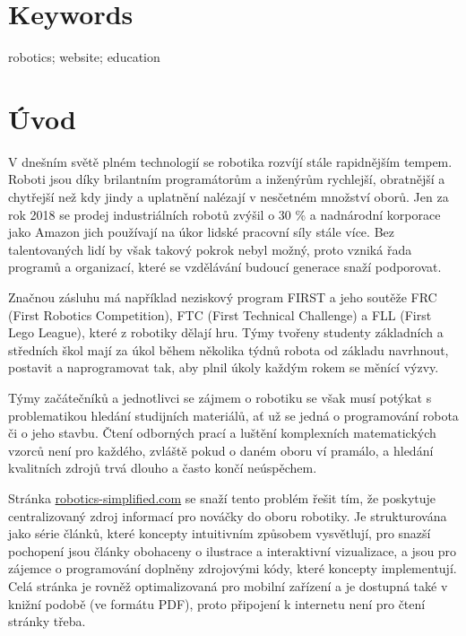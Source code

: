 \documentclass[a4paper, 12pt]{article}
\begin{document}
  \section*{\normalfont\textbf{Keywords}}
  robotics; website; education

  \newpage

  \setcounter{savepage}{\value{page}}%

  \renewcommand{\contentsname}{Obsah}
  \tableofcontents

  \newpage

  \section{Úvod}
  V dnešním světě plném technologií se robotika rozvíjí stále rapidnějším tempem. Roboti jsou díky brilantním programátorům a inženýrům rychlejší, obratnější a chytřejší než kdy jindy a uplatnění nalézají v nesčetném množství oborů. Jen za rok 2018 se prodej industriálních robotů zvýšil o 30 \%\cite{industrial-robot-growth} a nadnárodní korporace jako Amazon jich používají na úkor lidské pracovní síly stále více\cite{amazon-hiring}. Bez talentovaných lidí by však takový pokrok nebyl možný, proto vzniká řada programů a organizací, které se vzdělávání budoucí generace snaží podporovat.

  Značnou zásluhu má například neziskový program FIRST\cite{first-inspires} a jeho soutěže FRC (First Robotics Competition), FTC (First Technical Challenge) a FLL (First Lego League), které z robotiky dělají hru. Týmy tvořeny studenty základních a středních škol mají za úkol během několika týdnů robota od základu navrhnout, postavit a naprogramovat tak, aby plnil úkoly každým rokem se měnící výzvy.

  Týmy začátečníků a jednotlivci se zájmem o robotiku se však musí potýkat s problematikou hledání studijních materiálů, ať už se jedná o programování robota či o jeho stavbu. Čtení odborných prací a luštění komplexních matematických vzorců není pro každého, zvláště pokud o daném oboru ví pramálo, a hledání kvalitních zdrojů trvá dlouho a často končí neúspěchem.

  Stránka \url{robotics-simplified.com} se snaží tento problém řešit tím, že poskytuje centralizovaný zdroj informací pro nováčky do oboru robotiky. Je strukturována jako série článků, které koncepty intuitivním způsobem vysvětlují, pro snazší pochopení jsou články obohaceny o ilustrace a interaktivní vizualizace, a jsou pro zájemce o programování doplněny zdrojovými kódy, které koncepty implementují. Celá stránka je rovněž optimalizovaná pro mobilní zařízení a je dostupná také v knižní podobě (ve formátu PDF), proto připojení k internetu není pro čtení stránky třeba.
\end{document}
